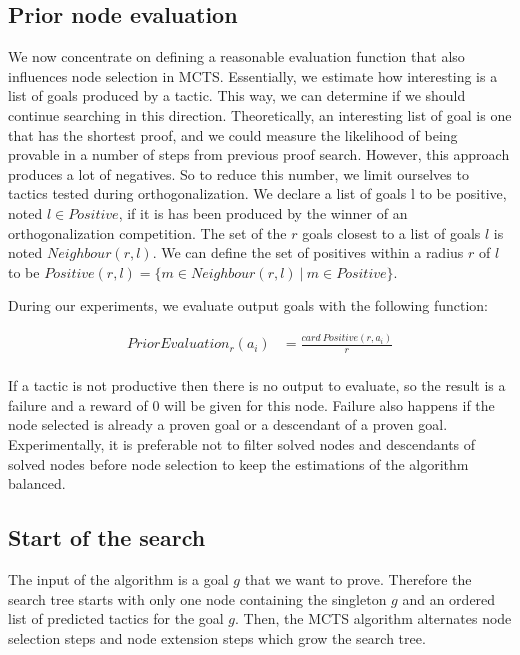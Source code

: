 \documentclass[runningheads,a4paper,draft]{svjour3}
\begin{document}
\subsection{Prior node evaluation}\label{sec:evaluation}

We now concentrate on defining a reasonable evaluation function that also 
influences node selection in MCTS. Essentially, we estimate how 
interesting is a list of goals produced by a tactic. This way, we can determine 
if we should continue searching in this direction. Theoretically, an 
interesting list of goal is one 
that has the shortest proof, and we could measure the likelihood of being 
provable in a number of steps from previous proof search. However, this 
approach produces a lot of negatives. So to reduce this number, we limit 
ourselves to tactics tested during orthogonalization. We declare a list 
of goals l to be positive, noted $l \in Positive$, if it is has been 
produced by the winner of an orthogonalization competition. The set of the $r$ 
goals closest to a list of goals $l$ is noted $Neighbour(r,l)$. We can 
define the set of positives within a 
radius $r$ of $l$ to be $Positive(r,l) = \lbrace m \in Neighbour(r,l)\ |\ m \in 
Positive \rbrace$.

During our experiments, we evaluate output goals with the following function:

\begin{align*}
PriorEvaluation_r (a_i) &= \frac{card\ Positive(r,a_i)}{r}\\
\end{align*}

If a tactic is not productive then there is no output to evaluate, so the 
result is a failure and a reward of $0$ will be 
given for this node. Failure also happens if the node selected is already 
a proven goal or a descendant of a proven goal. Experimentally, it is 
preferable not 
to filter solved nodes and descendants of solved nodes before node selection 
to keep the estimations of the algorithm balanced.


\subsection{Start of the search}
The input of the algorithm is a goal $g$ that we want to prove.
Therefore the search tree starts with only one node containing the singleton 
$g$ and an ordered list of predicted tactics for the goal $g$.
Then, the MCTS algorithm alternates node selection steps and node extension 
steps which grow the search tree.
\end{document}
